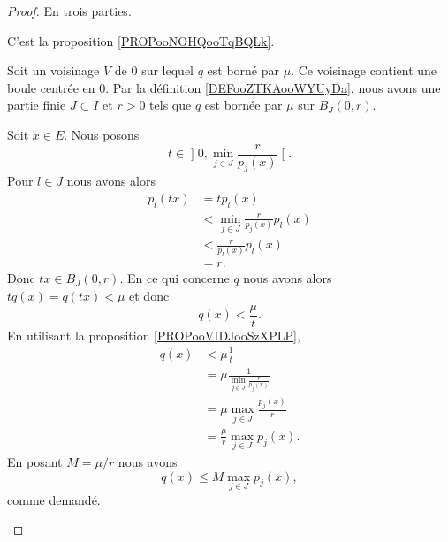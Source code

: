 \begin{proof}
	En trois parties.
	\begin{subproof}
		\spitem[\ref{ITEMooHKNYooARXiXs} \( \Rightarrow\) \ref{ITEMooWXSWooVfvSUy}]

		C'est la proposition \ref{PROPooNOHQooTqBQLk}.

		\spitem[\ref{ITEMooWXSWooVfvSUy} \( \Rightarrow\) \ref{ITEMooBBNCooGwHrUI}]

		Soit un voisinage \( V\) de \( 0\) sur lequel \( q\) est borné par \( \mu\). Ce voisinage contient une boule centrée en \( 0\). Par la définition \ref{DEFooZTKAooWYUyDa}, nous avons une partie finie \( J\subset I\) et \( r>0\) tels que \( q\) est bornée par \( \mu\) sur \( B_J(0,r)\).

		Soit \( x\in E\). Nous posons
		\begin{equation}
			t\in\mathopen] 0,\min_{j\in J}\frac{ r }{ p_j(x) }\mathclose[.
		\end{equation}
		Pour \( l\in J\) nous avons alors
		\begin{subequations}
			\begin{align}
				p_l(tx) & =tp_l(x)                                 \\
				        & <\min_{j\in J}\frac{ r }{ p_j(x) }p_l(x) \\
				        & <\frac{ r }{ p_l(x) }p_l(x)              \\
				        & =r.
			\end{align}
		\end{subequations}
		Donc \( tx\in B_J(0,r)\). En ce qui concerne \( q\) nous avons alors \( tq(x)=q(tx)<\mu\) et donc
		\begin{equation}
			q(x)<\frac{ \mu }{ t }.
		\end{equation}
		En utilisant la proposition \ref{PROPooVIDJooSzXPLP},
		\begin{subequations}
			\begin{align}
				q(x) & <\mu\frac{1}{  t}                                \\
				     & =\mu\frac{1}{ \min_{j\in J}\frac{ r }{ p_j(x) }} \\
				     & =\mu\max_{j\in J}\frac{ p_j(x) }{ r }            \\
				     & =\frac{ \mu }{ r }\max_{j\in J}p_j(x).
			\end{align}
		\end{subequations}
		En posant \( M=\mu/r\) nous avons
		\begin{equation}
			q(x)\leq M\max_{j\in J}p_j(x),
		\end{equation}
		comme demandé.


\end{subproof}
\end{proof}
